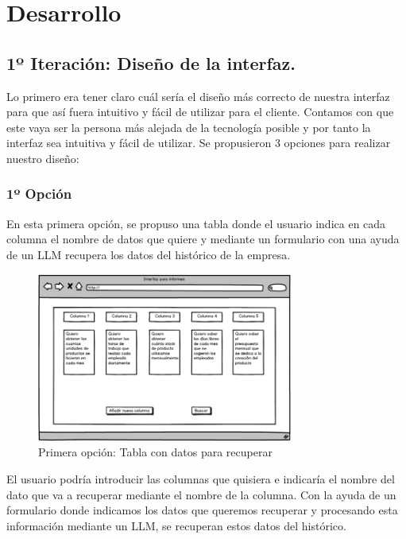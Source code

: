 \chapter{Desarrollo}
\label{chap:Desarrollo}

\section{1º Iteración: Diseño de la interfaz.}

Lo primero era tener claro cuál sería el diseño más correcto de nuestra interfaz para que así fuera intuitivo y fácil de utilizar para el cliente. Contamos con que este vaya ser la persona más alejada de la tecnología posible y por tanto la interfaz sea intuitiva y fácil de utilizar. Se propusieron 3 opciones para realizar nuestro diseño:

\subsection{1º Opción}

En esta primera opción, se propuso una tabla donde el usuario indica en cada columna el nombre de datos que quiere y mediante un formulario con una ayuda de un LLM recupera los datos del histórico de la empresa.

\begin{figure}[hp!]
    \centering
    \includegraphics[width=0.75\textwidth]{imaxes/iteracion1.1.png}
    \caption{Primera opción: Tabla con datos para recuperar}
    \label{fig:iteracion1.1}
\end{figure}

El usuario podría introducir las columnas que quisiera e indicaría el nombre del dato que va a recuperar mediante el nombre de la columna. Con la ayuda de un formulario donde indicamos los datos que queremos recuperar y procesando esta información mediante un LLM, se recuperan estos datos del histórico.

